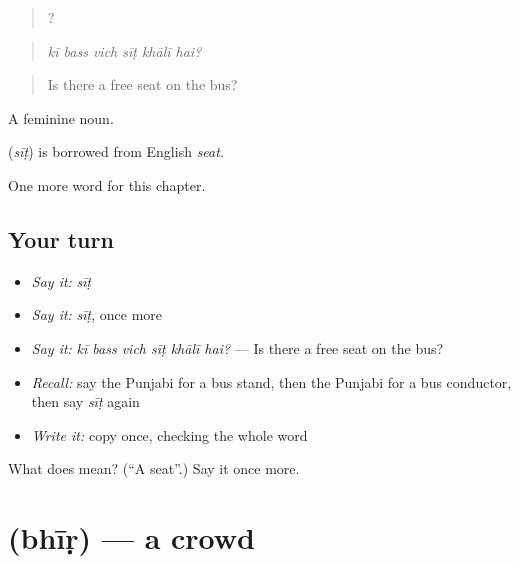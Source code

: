 \begin{quote}
     ?
\end{quote}

\begin{quote}
\emph{kī bass vich sīṭ khālī hai?}
\end{quote}

\begin{quote}
Is there a free seat on the bus?
\end{quote}

A feminine noun.

\begin{cousinweb}
\textbf{} (\emph{sīṭ}) is borrowed from English \emph{seat}.
\end{cousinweb}

\begin{grammarlens}[title={What you've built}]
One more word for this chapter.
\end{grammarlens}

\subsection*{Your turn}
\begin{itemize}
\raggedright
  \item \emph{Say it:} \emph{sīṭ}
  \item \emph{Say it:} \emph{sīṭ}, once more
  \item \emph{Say it:} \emph{kī bass vich sīṭ khālī hai?} — Is there a free seat on the bus?
  \item \emph{Recall:} say the Punjabi for a bus stand, then the Punjabi for a bus conductor, then say \emph{sīṭ} again
  \item \emph{Write it:} copy \textbf{} once, checking the whole word
\end{itemize}

\begin{tcolorbox}[breakable,colback=teal!4,colframe=teal!35!black,title={Before you move on}]
What does  mean? (\textquotedblleft{}A seat\textquotedblright{}.) Say it once more.
\end{tcolorbox}
\section[\texorpdfstring{\pa{ਭੀੜ} (bhīṛ)}{ਭੀੜ (bhīṛ)}]{ (bhīṛ) — a crowd}

\label{lesson:PA-C268-bhir}



